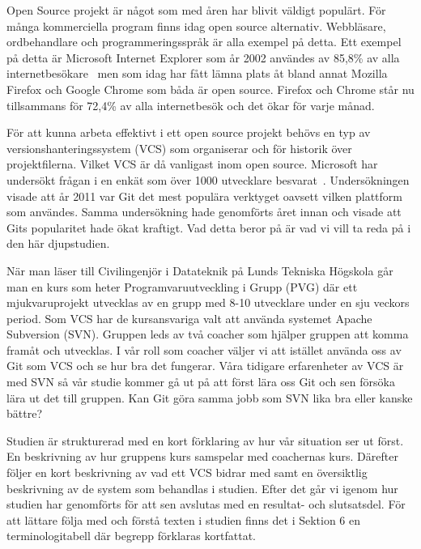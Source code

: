 Open Source projekt är något som med åren har blivit väldigt populärt. För många kommerciella program finns idag open source alternativ. Webbläsare, ordbehandlare och programmeringsspråk är alla exempel på detta. Ett exempel på detta är Microsoft Internet Explorer som år 2002 användes av 85,8\% av alla internetbesökare~\cite{Browser} men som idag har fått lämna plats åt bland annat Mozilla Firefox och Google Chrome som båda är open source. Firefox och Chrome står nu tillsammans för 72,4\% av alla internetbesök och det ökar för varje månad.

För att kunna arbeta effektivt i ett open source projekt behövs en typ av versionshanteringssystem (VCS) som organiserar och för historik över projektfilerna. Vilket VCS är då vanligast inom open source. Microsoft har undersökt frågan i en enkät som över 1000 utvecklare besvarat~\cite{OpenSource}. Undersökningen visade att år 2011 var Git det mest populära verktyget oavsett vilken plattform som användes. Samma undersökning hade genomförts året innan och visade att Gits popularitet hade ökat kraftigt. Vad detta beror på är vad vi vill ta reda på i den här djupstudien.

När man läser till Civilingenjör i Datateknik på Lunds Tekniska Högskola går man en kurs som heter Programvaruutveckling i Grupp (PVG) där ett mjukvaruprojekt utvecklas av en grupp med 8-10 utvecklare under en sju veckors period. Som VCS har de kursansvariga valt att använda systemet Apache Subversion (SVN). Gruppen leds av två coacher som hjälper gruppen att komma framåt och utvecklas. I vår roll som coacher väljer vi att istället använda oss av Git som VCS och se hur bra det fungerar. Våra tidigare erfarenheter av VCS är med SVN så vår studie kommer gå ut på att först lära oss Git och sen försöka lära ut det till gruppen. Kan Git göra samma jobb som SVN lika bra eller kanske bättre? 

Studien är strukturerad med en kort förklaring  av hur vår situation ser ut först. En beskrivning av hur gruppens kurs samspelar med coachernas kurs. Därefter följer en kort beskrivning av vad ett VCS bidrar med samt en översiktlig beskrivning av de system som behandlas i studien. Efter det går vi igenom hur studien har genomförts för att sen avslutas med en resultat- och slutsatsdel. För att lättare följa med och förstå texten i studien finns det i Sektion 6 en terminologitabell där begrepp förklaras kortfattat. 